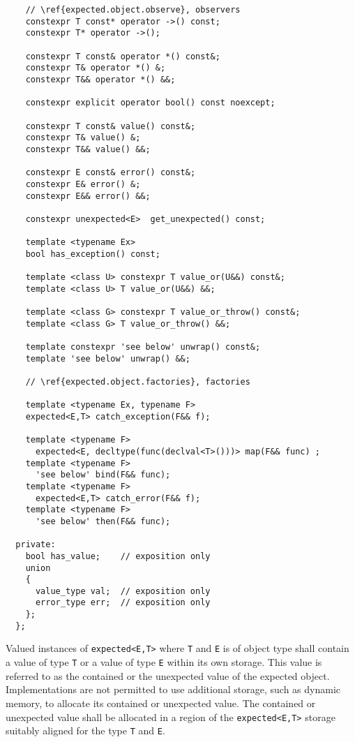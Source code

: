 \documentclass[a4paper,10pt]{article}
\newcommand{\cpp}[1]{\lstinline{#1}}
\begin{document}
\begin{lstlisting}
    // \ref{expected.object.observe}, observers
    constexpr T const* operator ->() const;
    constexpr T* operator ->();
    
    constexpr T const& operator *() const&;
    constexpr T& operator *() &;
    constexpr T&& operator *() &&;
    
    constexpr explicit operator bool() const noexcept;
    
    constexpr T const& value() const&;
    constexpr T& value() &;
    constexpr T&& value() &&;
    
    constexpr E const& error() const&;
    constexpr E& error() &;
    constexpr E&& error() &&;
    
    constexpr unexpected<E>  get_unexpected() const;
    
    template <typename Ex>
    bool has_exception() const;
      
    template <class U> constexpr T value_or(U&&) const&;
    template <class U> T value_or(U&&) &&;
    
    template <class G> constexpr T value_or_throw() const&;
    template <class G> T value_or_throw() &&;

    template constexpr 'see below' unwrap() const&;
    template 'see below' unwrap() &&;

    // \ref{expected.object.factories}, factories

    template <typename Ex, typename F>
    expected<E,T> catch_exception(F&& f);

    template <typename F>
      expected<E, decltype(func(declval<T>()))> map(F&& func) ;
    template <typename F>
      'see below' bind(F&& func);
    template <typename F>
      expected<E,T> catch_error(F&& f);
    template <typename F>
      'see below' then(F&& func);
  
  private:
    bool has_value;    // exposition only
    union
    {
      value_type val;  // exposition only
      error_type err;  // exposition only
    };
  };

\end{lstlisting}


Valued instances of \cpp{expected<E,T>} where \cpp{T} and \cpp{E} is of object type shall contain a value of type \cpp{T} or a value of type \cpp{E} within its own storage. This value is referred to as the contained or the unexpected value of the expected object. Implementations are not permitted to use additional storage, such as dynamic memory, to allocate its contained or unexpected value. The contained or unexpected value shall be allocated in a region of the \cpp{expected<E,T>} storage suitably aligned for the type \cpp{T} and \cpp{E}.
\newline
\end{document}
